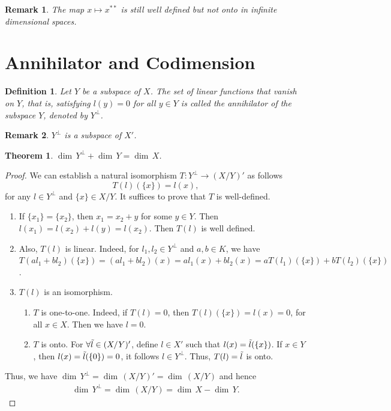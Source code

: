 \documentclass[11pt]{book}
\newtheorem{definition}{Definition}[chapter]
\newtheorem{theorem}{Theorem}[chapter]
\newtheorem{remark}{Remark}[chapter]
\theoremstyle{definition}
\numberwithin{equation}{chapter}
\begin{document}
\begin{remark}
The map $x \mapsto x^{**}$ is still well defined but not onto in infinite dimensional spaces.
\end{remark}

\medskip

\section{Annihilator and Codimension}
\begin{definition}
Let $Y$ be a subspace of $X$. The set of linear functions that vanish on $Y$, that is, satisfying $l(y) = 0$ for all $y\in Y$ is called the annihilator of the subspace $Y$, denoted by $Y^\bot$.
\end{definition}
\begin{remark}
$Y^\bot$ is a subspace of $X'$.
\end{remark}

\medskip

\begin{theorem}
$ \dim \,Y^\bot +  \dim \,Y =  \dim \,X$.
\end{theorem}
\begin{proof}
We can establish a natural isomorphism $T:Y^\bot\to (X/Y)'$ as follows $$T(l)(\{x\}) = l(x),$$
for any $l\in Y^\bot$ and $\{x\}\in X/Y$. It suffices to prove that $T$ is well-defined.
\begin{enumerate}[label=(\alph*)]
    \item If $\{x_1\} = \{x_2\}$, then $x_1 = x_2 + y$ for some $y\in Y$. Then $l(x_1) = l(x_2) + l(y) = l(x_2)$. Then $T(l)$ is well defined.
    \item Also, $T(l)$ is linear. Indeed, for $l_1, l_2\in Y^\bot$ and $a,b \in K$, we have $T(al_1 + bl_2)(\{x\}) = (al_1 + bl_2)(x) = a l_1(x) + bl_2(x) = a T(l_1)(\{x\}) + b T(l_2)(\{x\})$.
    \item $T(l)$ is an isomorphism. 
    \begin{enumerate}[label=\arabic*)]
        \item $T$ is one-to-one. Indeed, if $T(l) = 0$, then $T(l)(\{x\}) = l(x) = 0$, for all $x\in X$. Then we have $l = 0$.
        \item $T$ is onto. For $\forall \Tilde{l}\in (X/Y)'$, define $l\in X'$ such that $l(x) = \Tilde{l}(\{x\})$. If $x\in Y$, then $l(x) = \Tilde{l}(\{0\}) = 0$, it follows $l\in Y^\bot$. Thus, $T(l) = \Tilde{l}$ is onto.
    \end{enumerate}
\end{enumerate}

Thus, we have $ \dim \,Y^\bot =  \dim \,(X/Y)' =  \dim \,(X/Y)$ and hence 
\begin{align*}
     \dim \,Y^\bot =  \dim \,(X/Y) =  \dim \,X -  \dim \,Y.
\end{align*}
\end{proof}
\end{document}
